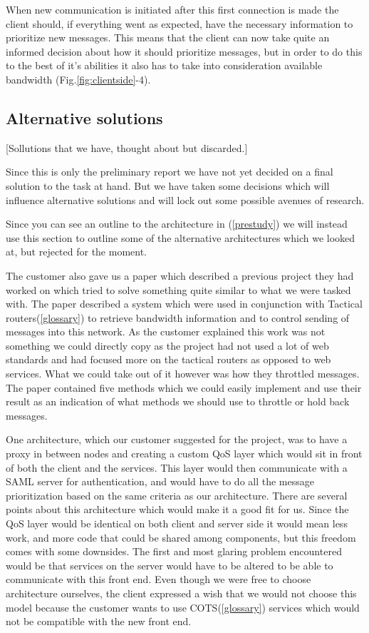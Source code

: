 \documentclass[12pt]{article}
\begin{document}
        When new communication is initiated after this first connection is made the client should, if everything went as expected, have the necessary information to prioritize new messages. This means that the client can now take quite an informed decision about how it should prioritize messages, but in order to do this to the best of it’s abilities it also has to take into consideration available bandwidth (Fig.\ref{fig:clientside}-4).
    
           
    \subsection{Alternative solutions}\label{alternativesolutions} [Sollutions that we have, thought about but discarded.]
    
        Since this is only the preliminary report we have not yet decided on a final solution to the task at hand. But we have taken some decisions which will influence alternative solutions and will lock out some possible avenues of research.

        Since you can see an outline to the architecture in (\ref{prestudy}) we will instead use this section to outline some of the alternative architectures which we looked at, but rejected for the moment.

        The customer also gave us a paper\cite{soa-qos-pdf} which described a previous project they had worked on which tried to solve something quite similar to what we were tasked with. The paper described a system which were used in conjunction with Tactical routers(\ref{glossary}) to retrieve bandwidth information and to control sending of messages into this network. As the customer explained this work was not something we could directly copy as the project had not used a lot of web standards and had focused more on the tactical routers as opposed to web services. What we could take out of it however was how they throttled messages. The paper contained five methods which we could easily implement and use their result as an indication of what methods we should use to throttle or hold back messages.

        One architecture, which our customer suggested for the project, was to have a proxy in between nodes and creating a custom QoS layer which would sit in front of both the client and the services. This layer would then communicate with a SAML server for authentication, and would have to do all the message prioritization based on the same criteria as our architecture. There are several points about this architecture which would make it a good fit for us. Since the QoS layer would be identical on both client and server side it would mean less work, and more code that could be shared among components, but this freedom comes with some downsides. The first and most glaring problem encountered would be that services on the server would have to be altered to be able to communicate with this front end. Even though we were free to choose architecture ourselves, the client expressed a wish that we would not choose this model because the customer wants to use COTS(\ref{glossary}) services which would not be compatible with the new front end.
\end{document}
